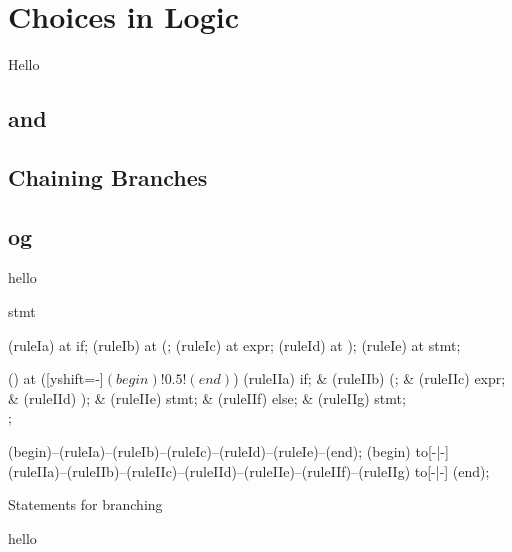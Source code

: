 \section{Choices in Logic}
\label{sec:flow:branch}

Hello

\subsection{ and }
\subsection{}
\subsection{Chaining Branches}
\subsection{ og }

\csharpsubsection{\csharp}
hello

\begin{syntaxfloat}
  \begin{syntax}{stmt}
    
    \node[terminal]    (ruleIa)  at  {if};
    \node[terminal]    (ruleIb)  at  {(};
    \node[nonterminal] (ruleIc)  at  {expr};
    \node[terminal]    (ruleId)  at  {)};
    \node[nonterminal] (ruleIe)  at  {stmt};
    
    \node[sequence] () at ([yshift=-\syntaxruledist]$(begin)!0.5!(end)$) {
      \node[terminal]    (ruleIIa) {if};
      &
      \node[terminal]    (ruleIIb) {(};
      &
      \node[nonterminal] (ruleIIc) {expr};
      &
      \node[terminal]    (ruleIId) {)};
      &
      \node[nonterminal] (ruleIIe) {stmt};
      &
      \node[terminal]    (ruleIIf) {else};
      &
      \node[nonterminal] (ruleIIg) {stmt};
      \\
    };
    
    \draw[path] (begin)--(ruleIa)--(ruleIb)--(ruleIc)--(ruleId)--(ruleIe)--(end);
    \draw[path] (begin) to[-|-] (ruleIIa)--(ruleIIb)--(ruleIIc)--(ruleIId)--(ruleIIe)--(ruleIIf)--(ruleIIg) to[-|-] (end);
  \end{syntax}
  \caption{Statements for branching}
\end{syntaxfloat}

hello
